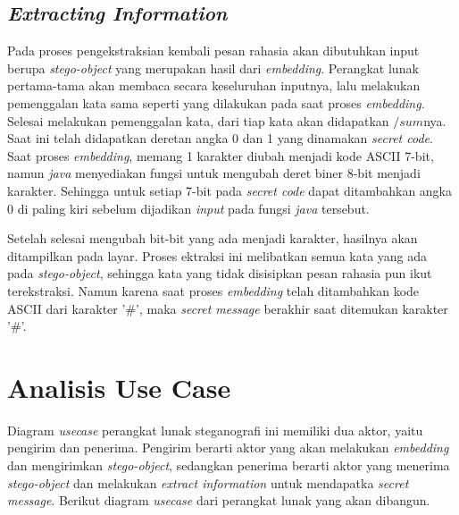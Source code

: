\subsection{\textit{Extracting Information}}
Pada proses pengekstraksian kembali pesan rahasia akan dibutuhkan input berupa \textit{stego-object} yang merupakan hasil dari \textit{embedding}. Perangkat lunak pertama-tama akan membaca secara keseluruhan inputnya, lalu melakukan pemenggalan kata sama seperti yang dilakukan pada saat proses \textit{embedding}. Selesai melakukan pemenggalan kata, dari tiap kata akan didapatkan $/sum$nya. Saat ini telah didapatkan deretan angka 0 dan 1 yang dinamakan \textit{secret code}. Saat proses \textit{embedding}, memang 1 karakter diubah menjadi kode ASCII 7-bit, namun \textit{java} menyediakan fungsi untuk mengubah deret biner 8-bit menjadi karakter. Sehingga untuk setiap 7-bit pada \textit{secret code} dapat ditambahkan angka 0 di paling kiri sebelum dijadikan \textit{input} pada fungsi \textit{java} tersebut.

Setelah selesai mengubah bit-bit yang ada menjadi karakter, hasilnya akan ditampilkan pada layar. Proses ektraksi ini melibatkan semua kata yang ada pada \textit{stego-object}, sehingga kata yang tidak disisipkan pesan rahasia pun ikut terekstraksi. Namun karena saat proses \textit{embedding} telah ditambahkan kode ASCII dari karakter '\#', maka \textit{secret message} berakhir saat ditemukan karakter '\#'. 

\section{Analisis Use Case}

Diagram \textit{usecase} perangkat lunak steganografi ini memiliki dua aktor, yaitu pengirim dan penerima. Pengirim berarti aktor yang akan melakukan \textit{embedding} dan mengirimkan \textit{stego-object}, sedangkan penerima berarti aktor yang menerima \textit{stego-object} dan melakukan \textit{extract information} untuk mendapatka \textit{secret message}. Berikut diagram \textit{usecase} dari perangkat lunak yang akan dibangun.

